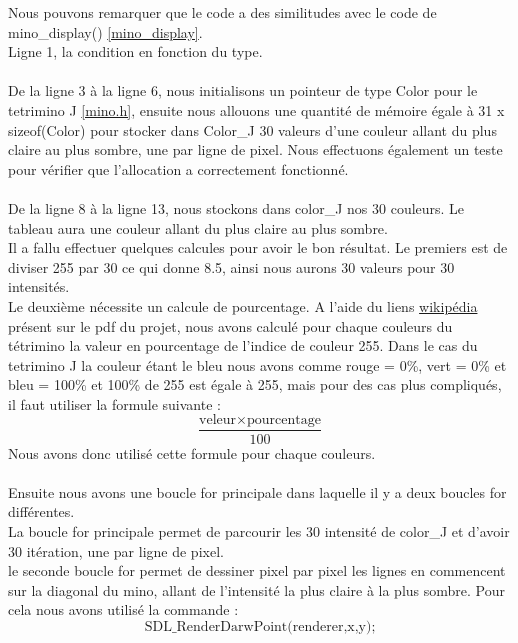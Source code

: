 \documentclass[a4paper,10p]{report}
\begin{document}
Nous pouvons remarquer que le code a des similitudes avec le code de mino\_display() \ref{mino_display}.
\\Ligne \textcolor{gris}{1}, la condition en fonction du type.
\\\\
De la ligne \textcolor{gris}{3} à la ligne \textcolor{gris}{6}, nous initialisons un pointeur de type Color pour le tetrimino J \ref{mino.h}, ensuite nous allouons une quantité de mémoire égale à 31 x sizeof(Color) pour stocker dans Color\_J 30 valeurs d'une couleur allant du plus claire au plus sombre, une par ligne de pixel. Nous effectuons également un teste pour vérifier que l'allocation a correctement fonctionné.
\\\\
De la ligne \textcolor{gris}{8} à la ligne \textcolor{gris}{13}, nous stockons dans color\_J nos 30 couleurs. Le tableau aura une couleur allant du plus claire au plus sombre.
\\Il a fallu effectuer quelques calcules pour avoir le bon résultat. Le premiers est de diviser 255 par 30 ce qui donne 8.5, ainsi nous aurons 30 valeurs pour 30 intensités.
\\Le deuxième nécessite un calcule de pourcentage. A l'aide du liens \href{https://en.wikipedia.org/wiki/X11_color_names#Derived_lists}{wikipédia} présent sur le pdf du projet, nous avons calculé pour chaque couleurs du tétrimino la valeur en pourcentage de l'indice de couleur 255. Dans le cas du tetrimino J la couleur étant le bleu nous avons comme rouge = 0\%, vert = 0\% et bleu = 100\% et 100\% de 255 est égale à 255, mais pour des cas plus compliqués, il faut utiliser la formule suivante :
\begin{equation}
    \frac{\text{veleur} \times \text{pourcentage}}{100}
\end{equation}
Nous avons donc utilisé cette formule pour chaque couleurs.
\\\\
Ensuite nous avons une boucle for principale dans laquelle il y a deux boucles for différentes.
\\La boucle for principale permet de parcourir les 30 intensité de color\_J et d'avoir 30 itération, une par ligne de pixel.
\\le seconde boucle for permet de dessiner pixel par pixel les lignes en commencent sur la diagonal du mino, allant de l'intensité la plus claire à la plus sombre. Pour cela nous avons utilisé la commande :
\begin{equation*}
    \text{SDL\_RenderDarwPoint(renderer,x,y);}
\end{equation*}
\end{document}
